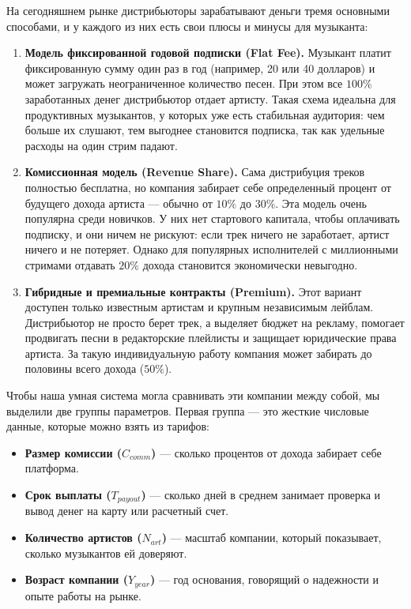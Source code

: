\documentclass[14pt, a4paper]{extarticle}
\begin{document}
На сегодняшнем рынке дистрибьюторы зарабатывают деньги тремя основными способами, и у каждого из них есть свои плюсы и минусы для музыканта:
\begin{enumerate}
    \item \textbf{Модель фиксированной годовой подписки (Flat Fee).} Музыкант платит фиксированную сумму один раз в год (например, 20 или 40 долларов) и может загружать неограниченное количество песен. При этом все $100\%$ заработанных денег дистрибьютор отдает артисту. Такая схема идеальна для продуктивных музыкантов, у которых уже есть стабильная аудитория: чем больше их слушают, тем выгоднее становится подписка, так как удельные расходы на один стрим падают.
    \item \textbf{Комиссионная модель (Revenue Share).} Сама дистрибуция треков полностью бесплатна, но компания забирает себе определенный процент от будущего дохода артиста — обычно от $10\%$ до $30\%$. Эта модель очень популярна среди новичков. У них нет стартового капитала, чтобы оплачивать подписку, и они ничем не рискуют: если трек ничего не заработает, артист ничего и не потеряет. Однако для популярных исполнителей с миллионными стримами отдавать $20\%$ дохода становится экономически невыгодно.
    \item \textbf{Гибридные и премиальные контракты (Premium).} Этот вариант доступен только известным артистам и крупным независимым лейблам. Дистрибьютор не просто берет трек, а выделяет бюджет на рекламу, помогает продвигать песни в редакторские плейлисты и защищает юридические права артиста. За такую индивидуальную работу компания может забирать до половины всего дохода ($50\%$).
\end{enumerate}

Чтобы наша умная система могла сравнивать эти компании между собой, мы выделили две группы параметров. Первая группа — это жесткие числовые данные, которые можно взять из тарифов:
\begin{itemize}
    \item \textbf{Размер комиссии ($C_{comm}$)} — сколько процентов от дохода забирает себе платформа.
    \item \textbf{Срок выплаты ($T_{payout}$)} — сколько дней в среднем занимает проверка и вывод денег на карту или расчетный счет.
    \item \textbf{Количество артистов ($N_{art}$)} — масштаб компании, который показывает, сколько музыкантов ей доверяют.
    \item \textbf{Возраст компании ($Y_{year}$)} — год основания, говорящий о надежности и опыте работы на рынке.
\end{itemize}
\end{document}
